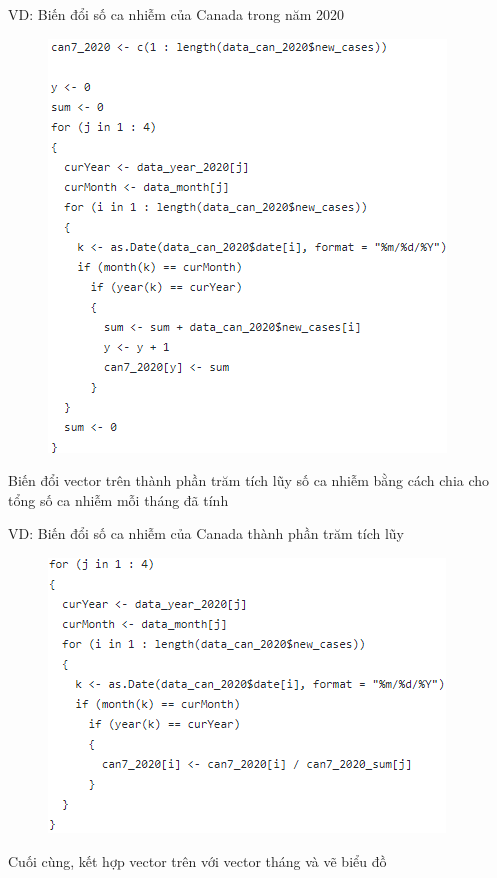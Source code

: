 \documentclass[a4paper]{article}
\theoremstyle{definition}
\begin{document}
\begin{enumerate}[i)]
\begin{enumerate}[1]
    VD: Biến đổi số ca nhiễm của Canada trong năm 2020
            \begin{figure}[H]
				\centering
				\includegraphics{images/5.0.5.png}
			\end{figure}
	Biến đổi vector trên thành phần trăm tích lũy số ca nhiễm bằng cách chia cho tổng số ca nhiễm mỗi tháng đã tính
	
    VD: Biến đổi số ca nhiễm của Canada thành phần trăm tích lũy
            \begin{figure}[H]
				\centering
				\includegraphics{images/5.0.6.png}
			\end{figure}
	Cuối cùng, kết hợp vector trên với vector tháng và vẽ biểu đồ 
	

\end{enumerate}
\end{enumerate}
\end{document}
